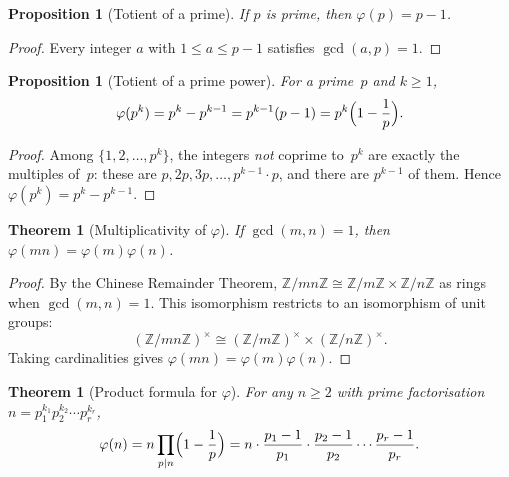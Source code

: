\documentclass[12pt,a4paper,openany]{book}
\theoremstyle{definition}
\theoremstyle{plain}
\newtheorem{theorem}[definition]{Theorem}
\newtheorem{proposition}[definition]{Proposition}
\theoremstyle{remark}
\newcommand{\Z}{\mathbb{Z}}
\begin{document}
\begin{proposition}[Totient of a prime]
\label{prop:totient-prime}
If $p$ is prime, then $\varphi(p) = p - 1$.
\end{proposition}

\begin{proof}
Every integer $a$ with $1 \le a \le p-1$ satisfies $\gcd(a,p) = 1$.
\end{proof}

\begin{proposition}[Totient of a prime power]
\label{prop:totient-prime-power}
For a prime~$p$ and $k \ge 1$,
\[
  \varphi(p^k) = p^k - p^{k-1} = p^{k-1}(p-1) = p^k\Bigl(1 - \frac{1}{p}\Bigr).
\]
\end{proposition}

\begin{proof}
Among $\{1, 2, \dots, p^k\}$, the integers \emph{not} coprime to~$p^k$
are exactly the multiples of~$p$: these are $p, 2p, 3p, \dots, p^{k-1}\cdot p$,
and there are $p^{k-1}$ of them.  Hence $\varphi(p^k) = p^k - p^{k-1}$.
\end{proof}

\begin{theorem}[Multiplicativity of $\varphi$]
\label{thm:totient-mult}
If $\gcd(m,n) = 1$, then $\varphi(mn) = \varphi(m)\varphi(n)$.
\end{theorem}

\begin{proof}
By the Chinese Remainder Theorem,
$\Z/mn\Z \cong \Z/m\Z \times \Z/n\Z$ as rings when $\gcd(m,n) = 1$.
This isomorphism restricts to an isomorphism of unit groups:
\[
  (\Z/mn\Z)^\times \cong (\Z/m\Z)^\times \times (\Z/n\Z)^\times.
\]
Taking cardinalities gives $\varphi(mn) = \varphi(m)\varphi(n)$.
\end{proof}

\begin{theorem}[Product formula for $\varphi$]
\label{thm:totient-formula}
For any $n \ge 2$ with prime factorisation $n = p_1^{k_1} p_2^{k_2} \cdots p_r^{k_r}$,
\[
  \varphi(n) = n \prod_{p \mid n} \Bigl(1 - \frac{1}{p}\Bigr)
             = n \cdot \frac{p_1 - 1}{p_1} \cdot \frac{p_2 - 1}{p_2}
               \cdots \frac{p_r - 1}{p_r}.
\]
\end{theorem}
\end{document}
